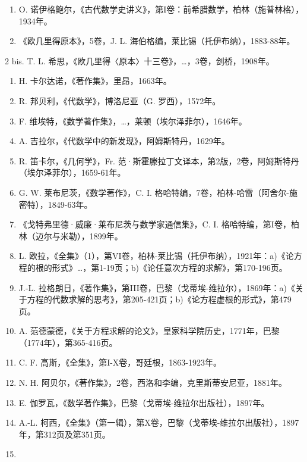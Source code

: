 
\begin{enumerate}
\def\labelenumi{\arabic{enumi}.}
\item
  O. 诺伊格鲍尔，《古代数学史讲义》，第I卷：前希腊数学，柏林（施普林格），1934年。
\item
  《欧几里得原本》，5卷，J. L. 海伯格编，莱比锡（托伊布纳），1883-88年。
\end{enumerate}

2 bis. T. L. 希思，《欧几里得〈原本〉十三卷》，\ldots，3卷，剑桥，1908年。

\begin{enumerate}
\def\labelenumi{\arabic{enumi}.}
\setcounter{enumi}{2}
\item
  H. 卡尔达诺，《著作集》，里昂，1663年。
\item
  R. 邦贝利，《代数学》，博洛尼亚（G. 罗西），1572年。
\item
  F. 维埃特，《数学著作集》，\ldots，莱顿（埃尔泽菲尔），1646年。
\item
  A. 吉拉尔，《代数学中的新发现》，阿姆斯特丹，1629年。
\item
  R. 笛卡尔，《几何学》，Fr. 范·斯霍滕拉丁文译本，第2版，2卷，阿姆斯特丹（埃尔泽菲尔），1659-61年。
\item
  G. W. 莱布尼茨，《数学著作》，C. I. 格哈特编，7卷，柏林-哈雷（阿舍尔-施密特），1849-63年。
\item
  《戈特弗里德·威廉·莱布尼茨与数学家通信集》，C. I. 格哈特编，第I卷，柏林（迈尔与米勒），1899年。
\item
  L. 欧拉，《全集》（1），第VI卷，柏林-莱比锡（托伊布纳），1921年：a)《论方程的根的形式》\ldots，第1-19页；b)《论任意次方程的求解》，第170-196页。
\item
  J.-L. 拉格朗日，《著作集》，第III卷，巴黎（戈蒂埃-维拉尔），1869年：a)《关于方程的代数求解的思考》，第205-421页；b)《论方程虚根的形式》，第479页。
\item
  A. 范德蒙德，《关于方程求解的论文》，皇家科学院历史，1771年，巴黎（1774年），第365-416页。
\item
  C. F. 高斯，《全集》，第I-X卷，哥廷根，1863-1923年。
\item
  N. H. 阿贝尔，《著作集》，2卷，西洛和李编，克里斯蒂安尼亚，1881年。
\item
  E. 伽罗瓦，《数学著作集》，巴黎（戈蒂埃-维拉尔出版社），1897年。
\item
  A.-L. 柯西，《全集》（第一辑），第X卷，巴黎（戈蒂埃-维拉尔出版社），1897年，第312页及第351页。
\item

\end{enumerate}
